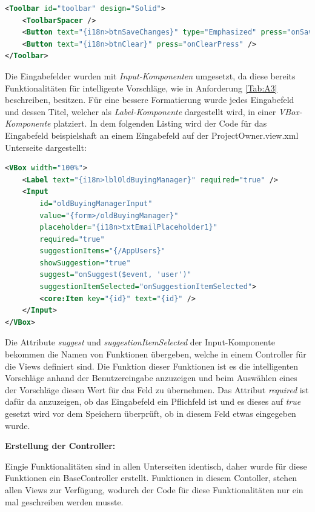 \begin{lstlisting}[caption={Toolbar der Unterseiten}, label={lst:toolbar}, language={XML}]
<Toolbar id="toolbar" design="Solid">
    <ToolbarSpacer />
    <Button text="{i18n>btnSaveChanges}" type="Emphasized" press="onSaveChangesPress" />
    <Button text="{i18n>btnClear}" press="onClearPress" />
</Toolbar>
\end{lstlisting}

Die Eingabefelder wurden mit \textit{Input-Komponenten} umgesetzt, da diese bereits Funktionalitäten für intelligente Vorschläge, wie in Anforderung \ref{Tab:A3} beschreiben, besitzen.
Für eine bessere Formatierung wurde jedes Eingabefeld und dessen Titel, welcher als \textit{Label-Komponente} dargestellt wird, in einer \textit{VBox-Komponente} platziert.
In dem folgenden Listing wird der Code für das Eingabefeld beispielshaft an einem Eingabefeld auf der ProjectOwner.view.xml Unterseite dargestellt:

\begin{lstlisting}[caption={Eingabefeld für Unterseiten}, language={XML}]
<VBox width="100%">
    <Label text="{i18n>lblOldBuyingManager}" required="true" />
    <Input
        id="oldBuyingManagerInput"
        value="{form>/oldBuyingManager}"
        placeholder="{i18n>txtEmailPlaceholder1}"
        required="true"
        suggestionItems="{/AppUsers}"
        showSuggestion="true"
        suggest="onSuggest($event, 'user')"
        suggestionItemSelected="onSuggestionItemSelected">
        <core:Item key="{id}" text="{id}" />
    </Input>
</VBox>
\end{lstlisting}

Die Attribute \textit{suggest} und \textit{suggestionItemSelected} der Input-Komponente bekommen die Namen von Funktionen übergeben, welche in einem Controller für die Views definiert sind.
Die Funktion dieser Funktionen ist es die intelligenten Vorschläge anhand der Benutzereingabe anzuzeigen und beim Auswählen eines der Vorschläge diesen Wert für das Feld zu übernehmen.
Das Attribut \textit{required} ist dafür da anzuzeigen, ob das Eingabefeld ein Pflichfeld ist und es dieses auf \textit{true} gesetzt wird vor dem Speichern überprüft, ob in diesem Feld etwas eingegeben wurde.

\textbf{Erstellung der Controller:}

Eingie Funktionalitäten sind in allen Unterseiten identisch, daher wurde für diese Funktionen ein BaseController erstellt.
Funktionen in diesem Contoller, stehen allen Views zur Verfügung, wodurch der Code für diese Funktionalitäten nur ein mal geschreiben werden musste.

